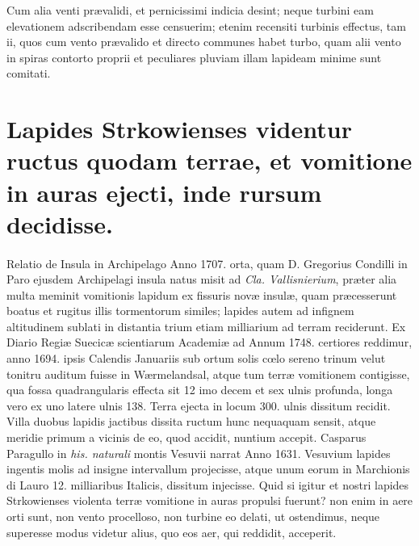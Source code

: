 \documentclass[a4paper, 11pt, oneside, polutonikogreek, latin]{article}
\begin{document}
Cum alia venti prævalidi, et pernicissimi indicia desint; neque turbini eam elevationem adscribendam esse censuerim; etenim recensiti turbinis effectus, tam ii, quos cum vento prævalido et directo communes habet turbo, quam alii vento in spiras contorto proprii et peculiares pluviam illam lapideam minime sunt comitati.
\clearpage
\section{Lapides Strkowienses videntur ructus quodam terrae, et vomitione in auras ejecti, inde rursum decidisse.}
\paragraph{}
Relatio de Insula in Archipelago Anno 1707. orta, quam D. Gregorius Condilli in Paro ejusdem Archipelagi insula natus misit ad \emph{Cla. Vallisnierium}, præter alia multa meminit vomitionis lapidum ex fissuris novæ insulæ, quam præcesserunt boatus et rugitus illis tormentorum similes; lapides autem ad infignem altitudinem sublati in distantia trium etiam milliarium ad terram reciderunt. Ex Diario Regiæ Suecicæ scientiarum Academiæ ad Annum 1748. certiores reddimur, anno 1694. ipsis Calendis Januariis sub ortum solis cœlo sereno trinum velut tonitru auditum fuisse in Wærmelandsal, atque tum terræ vomitionem contigisse, qua fossa quadrangularis effecta sit 12 imo decem et sex ulnis profunda, longa vero ex uno latere ulnis 138. Terra ejecta in locum 300. ulnis dissitum recidit. Villa duobus lapidis jactibus dissita ructum hunc nequaquam sensit, atque meridie primum a vicinis de eo, quod accidit, nuntium accepit. Casparus Paragullo in \emph{his. naturali} montis Vesuvii narrat Anno 1631. Vesuvium lapides ingentis molis ad insigne intervallum projecisse, atque unum eorum in Marchionis di Lauro 12. milliaribus Italicis, dissitum injecisse. Quid si igitur et nostri lapides Strkowienses violenta terræ vomitione in auras propulsi fuerunt? non enim in aere orti sunt, non vento procelloso, non turbine eo delati, ut ostendimus, neque superesse modus videtur alius, quo eos aer, qui reddidit, acceperit.
\end{document}
